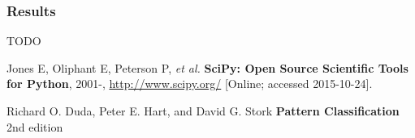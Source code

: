 \documentclass{article}
\begin{document}
\subsubsection{Results}
{\large TODO}


\begin{thebibliography}{9}

    Jones E, Oliphant E, Peterson P, \emph{et al.}
    {\bf SciPy: Open Source Scientific Tools for Python}, 2001-,
    \url{http://www.scipy.org/} [Online; accessed 2015-10-24].
    
	Richard O. Duda, Peter E. Hart, and David G. Stork
	{\bf Pattern Classification} 2nd edition

\end{thebibliography}
\end{document}
